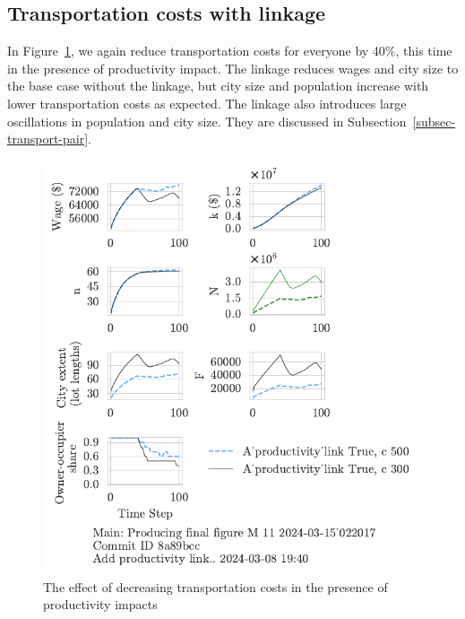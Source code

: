 { \newpage
\subsection{Transportation costs  with linkage}\label{subsec-transport-link}

In Figure~\ref{fig:Productivity_link_and_c_ownership_trajectory}, we again reduce transportation costs for everyone by 40\%, this time in the presence of productivity impact. The linkage reduces wages and city size to the base case without the linkage, but city size and population increase with lower transportation costs as expected. The linkage also introduces large oscillations in population and city size. They are discussed in Subsection~\ref{subsec-transport-pair}. 


\begin{figure}[h!t]
    \centering
    \includegraphics[scale=1, trim={0 1.4cm 0 0},clip]{fig/With-productivity_link-c-15_022017.pdf}
    \caption{The effect of decreasing transportation costs in the presence of productivity impacts}
    \label{fig:Productivity_link_and_c_ownership_trajectory}
\end{figure}



}
